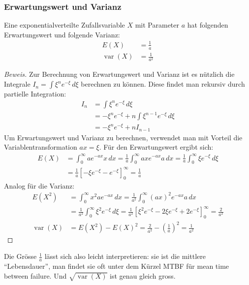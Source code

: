 \subsubsection{Erwartungswert und Varianz}
\begin{satz}Eine exponentialverteilte Zufallsvariable $X$ mit Parameter
$a$ hat folgenden Erwartungswert und folgende Varianz:
\begin{align*}
E(X)&=\frac1a\\
\operatorname{var}(X)&=\frac1{a^2}
\end{align*}
\end{satz}
\begin{proof}[Beweis]
Zur Berechnung von Erwartungswert und Varianz ist es nützlich die Integrale
$I_n=\int \xi^ne^{-\xi}\,d\xi$
berechnen zu können.
Diese findet man rekursiv durch partielle Integration:
\begin{align*}
I_n&=\int \xi^ne^{-\xi}\,d\xi\\
&=-\xi^ne^{-\xi}+n\int \xi^{n-1}e^{-\xi}\,d\xi\\
&=-\xi^ne^{-\xi}+nI_{n-1}
\end{align*}
Um Erwartungswert und Varianz zu berechnen, verwendet man mit Vorteil die
Variablentransformation $ax=\xi$.
Für den Erwartungswert ergibt sich:
\begin{align*}
E(X)&=\int_0^{\infty}ae^{-ax}x\,dx
=\frac1a\int_0^{\infty}ax e^{-ax}a\,dx
=\frac1a\int_0^{\infty}\xi e^{-\xi}\,d\xi\\
&=\frac1a\left[-\xi e^{-\xi}-e^{-\xi}\right]_0^\infty=\frac1a
\end{align*}
Analog für die Varianz:
\begin{align*}
E(X^2)
&=
\int_0^{\infty}x^2ae^{-ax}\,dx
=\frac1{a^2}\int_0^{\infty}(ax)^2e^{-ax}a\,dx\\
&=\frac1{a^2}\int_0^{\infty}\xi^2e^{-\xi}\,d\xi
=\frac1{a^2}\left[\xi^2e^{-\xi}-2\xi e^{-\xi}+2e^{-\xi}\right]_0^\infty
=\frac2{a^2}
\\
\operatorname{var}(X)
&=E(X^2)-E(X)^2=\frac2{a^2}-\left(\frac1a\right)^2=\frac1{a^2}
\end{align*}
\end{proof}
Die Grösse $\frac1a$ lässt sich also leicht interpretieren: sie ist die
mittlere ``Lebensdauer'', man findet sie oft unter dem Kürzel MTBF für
mean time between failure.
Und $\sqrt{\operatorname{var}(X)}$ 
ist genau gleich gross. 

